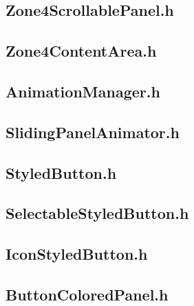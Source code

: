 \subsection{Zone4ScrollablePanel.h}


\subsection{Zone4ContentArea.h}


\subsection{AnimationManager.h}


\subsection{SlidingPanelAnimator.h}


\subsection{StyledButton.h}


\subsection{SelectableStyledButton.h}


\subsection{IconStyledButton.h}


\subsection{ButtonColoredPanel.h}


